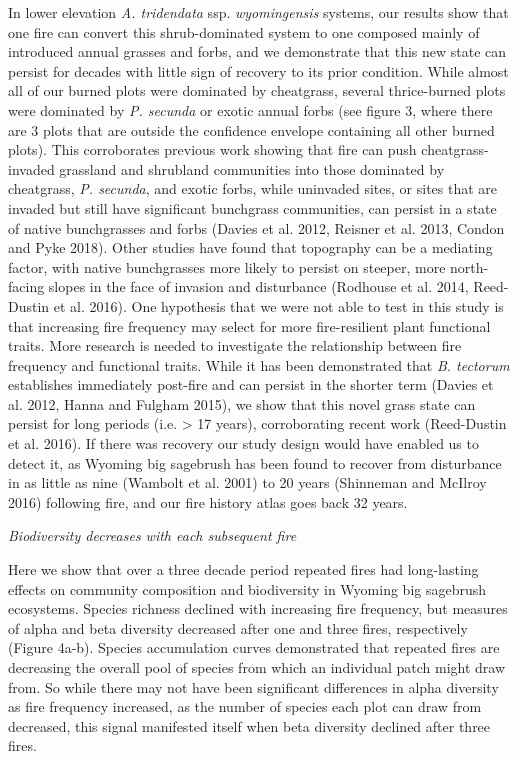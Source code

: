 \documentclass[12pt,]{article}
\begin{document}
In lower elevation \emph{A. tridendata} ssp. \emph{wyomingensis}
systems, our results show that one fire can convert this shrub-dominated
system to one composed mainly of introduced annual grasses and forbs,
and we demonstrate that this new state can persist for decades with
little sign of recovery to its prior condition. While almost all of our
burned plots were dominated by cheatgrass, several thrice-burned plots
were dominated by \emph{P. secunda} or exotic annual forbs (see figure
3, where there are 3 plots that are outside the confidence envelope
containing all other burned plots). This corroborates previous work
showing that fire can push cheatgrass-invaded grassland and shrubland
communities into those dominated by cheatgrass, \emph{P. secunda}, and
exotic forbs, while uninvaded sites, or sites that are invaded but still
have significant bunchgrass communities, can persist in a state of
native bunchgrasses and forbs (Davies et al. 2012, Reisner et al. 2013,
Condon and Pyke 2018). Other studies have found that topography can be a
mediating factor, with native bunchgrasses more likely to persist on
steeper, more north-facing slopes in the face of invasion and
disturbance (Rodhouse et al. 2014, Reed-Dustin et al. 2016). One
hypothesis that we were not able to test in this study is that
increasing fire frequency may select for more fire-resilient plant
functional traits. More research is needed to investigate the
relationship between fire frequency and functional traits. While it has
been demonstrated that \emph{B. tectorum} establishes immediately
post-fire and can persist in the shorter term (Davies et al. 2012, Hanna
and Fulgham 2015), we show that this novel grass state can persist for
long periods (i.e. \textgreater{} 17 years), corroborating recent work
(Reed-Dustin et al. 2016). If there was recovery our study design would
have enabled us to detect it, as Wyoming big sagebrush has been found to
recover from disturbance in as little as nine (Wambolt et al. 2001) to
20 years (Shinneman and McIlroy 2016) following fire, and our fire
history atlas goes back 32 years.

\emph{Biodiversity decreases with each subsequent fire}

Here we show that over a three decade period repeated fires had
long-lasting effects on community composition and biodiversity in
Wyoming big sagebrush ecosystems. Species richness declined with
increasing fire frequency, but measures of alpha and beta diversity
decreased after one and three fires, respectively (Figure 4a-b). Species
accumulation curves demonstrated that repeated fires are decreasing the
overall pool of species from which an individual patch might draw from.
So while there may not have been significant differences in alpha
diversity as fire frequency increased, as the number of species each
plot can draw from decreased, this signal manifested itself when beta
diversity declined after three fires.
\end{document}

